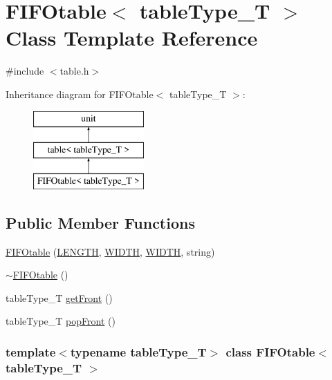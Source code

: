 \hypertarget{classFIFOtable}{
\section{FIFOtable$<$ tableType\_\-T $>$ Class Template Reference}
\label{classFIFOtable}
}


{\ttfamily \#include $<$table.h$>$}

Inheritance diagram for FIFOtable$<$ tableType\_\-T $>$:\begin{figure}[H]
\begin{center}
\leavevmode
\includegraphics[height=3.000000cm]{classFIFOtable}
\end{center}
\end{figure}
\subsection*{Public Member Functions}
\begin{DoxyCompactItemize}
\item 
\hyperlink{classFIFOtable_ad5ff5e6a3e0bf0b409f8b6d6ab5e4a5c}{FIFOtable} (\hyperlink{global_2global_8h_ad7ec63c69447a2b630929c8e0197860d}{LENGTH}, \hyperlink{global_2global_8h_a6fa2e24b8a418fa215e183264cbea3aa}{WIDTH}, \hyperlink{global_2global_8h_a6fa2e24b8a418fa215e183264cbea3aa}{WIDTH}, string)
\item 
\hyperlink{classFIFOtable_aed7aeb790ce1f0fbb429d645597554b5}{$\sim$FIFOtable} ()
\item 
tableType\_\-T \hyperlink{classFIFOtable_a96f42bb7a9f9b845970893bfe95ed2fb}{getFront} ()
\item 
tableType\_\-T \hyperlink{classFIFOtable_ace3286538766dfa4499d149767ac153f}{popFront} ()
\end{DoxyCompactItemize}
\subsubsection*{template$<$typename tableType\_\-T$>$ class FIFOtable$<$ tableType\_\-T $>$}



